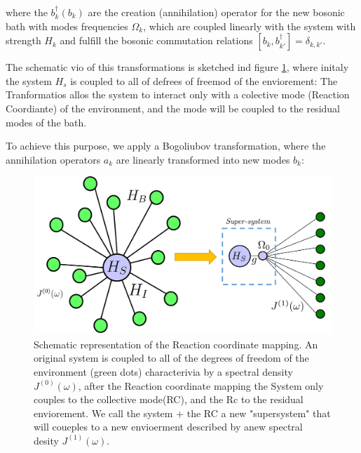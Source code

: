 \documentclass[%
preprint,
onecolumn,
notitlepag,
 amsmath,amssymb,
 aps,
 pra,
]{revtex4-2}
\begin{document}
where  the $b_k^{\dagger} (b_k)$ are the  creation (annihilation) operator for the new bosonic bath with modes frequencies $\Omega_k$, which are coupled linearly with the  system with strength $H_k$ and fulfill the bosonic commutation relations $ [ b_k , b_{k'}^{\dagger} ] = \delta_{k,k'}  $. 

The schematic vio of this transformations is sketched ind figure \ref{Rc_mapping_skecth}, where initaly  the system $H_s$  is coupled to all of defrees of freemod of the enviorement: The Tranformatios allos the system to interact only with a colective mode (Reaction Coordiante) of the environment, and the mode will be coupled to the residual modes of the bath.

To achieve this purpose, we apply a Bogoliubov transformation, where the annihilation operators $a_k$ are linearly transformed into  new modes $b_k$: 


\begin{figure}[!h]
\centering
\includegraphics[width=0.9\linewidth]{Images/Rc_mapping_skecth.png}
\caption{Schematic representation of the Reaction coordinate mapping.  An original system is coupled to all of the degrees of freedom of the environment (green dots) characterivia by  a spectral density $J^{(0)}(\omega)$, after the Reaction coordinate mapping the System only couples to the collective mode(RC), and the Rc to the residual enviorement. We call the system $+$ the RC a new "supersystem" that will coueples to a new envioerment described by anew spectral desity $J^{(1)}(\omega)$. }
\label{Rc_mapping_skecth}
\end{figure}
\end{document}
